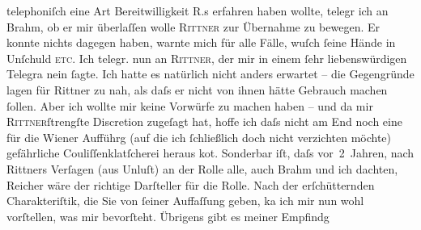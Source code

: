                telephoniſch eine Art Bereitwilligkeit R.s
               erfahren haben wollte, telegr ich an Brahm, ob
               er mir überlaſſen wolle \textsc{Rittner} zur Übernahme zu bewegen. Er konnte nichts dagegen haben, warnte mich für alle
               Fälle, wuſch{ }ſeine Hände in Unſchuld \textsc{etc.} Ich telegr. nun
               an \textsc{Rittner}, der mir in einem{ }ſehr liebenswürdigen Telegra{\geminationm}
               nein{ }ſagte. Ich hatte es natürlich nicht anders erwartet – die Gegengründe lagen für
                  Rittner zu nah, als daſs er nicht von ihnen
               hätte {\pb}Gebrauch machen{ }ſollen. Aber ich
               wollte mir keine Vorwürfe zu machen haben – und da mir \textsc{Rittner}ſtrengſte Discretion zugeſagt hat, hoffe ich daſs nicht am End noch eine für
               die Wiener Aufführg (auf die ich{ }ſchließlich doch
               nicht verzichten möchte) gefährliche Couliſſenklatſcherei heraus ko{\geminationm}t. Sonderbar iſt, daſs vor 2 Jahren, nach Rittners Verſagen (aus Unluſt) an der Rolle
               alle, auch Brahm und ich dachten, Reicher wäre der richtige Darſteller für die
               Rolle. Nach der erſchütternden Charakteriſtik, die Sie von{ }ſeiner Auffaſſung geben,
                  ka{\geminationn} ich mir nun wohl vorſtellen, was mir {\pb}bevorſteht. Übrigens gibt es meiner Empfindg
